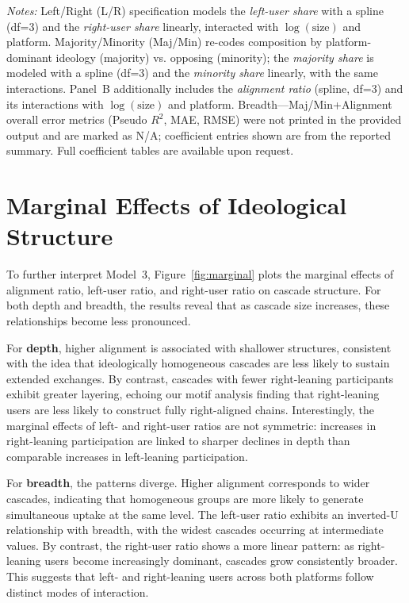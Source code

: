 \documentclass[letterpaper]{article} %
\begin{document}
\begin{table}[t]
\vspace{0.75ex}
\footnotesize
\textit{Notes:}
Left/Right (L/R) specification models the \emph{left-user share} with a spline (df=3) and the \emph{right-user share} linearly, interacted with $\log(\text{size})$ and platform.
Majority/Minority (Maj/Min) re-codes composition by platform-dominant ideology (majority) vs. opposing (minority); the \emph{majority share} is modeled with a spline (df=3) and the \emph{minority share} linearly, with the same interactions.
Panel~B additionally includes the \emph{alignment ratio} (spline, df=3) and its interactions with $\log(\text{size})$ and platform.
Breadth---Maj/Min+Alignment overall error metrics (Pseudo $R^2$, MAE, RMSE) were not printed in the provided output and are marked as N/A; coefficient entries shown are from the reported summary.
Full coefficient tables are available upon request.
\end{table}

\section*{Marginal Effects of Ideological Structure}

To further interpret Model~3, Figure~\ref{fig:marginal} plots the marginal effects of alignment ratio, left-user ratio, and right-user ratio on cascade structure. For both depth and breadth, the results reveal that as cascade size increases, these relationships become less pronounced.  

For \textbf{depth}, higher alignment is associated with shallower structures, consistent with the idea that ideologically homogeneous cascades are less likely to sustain extended exchanges. By contrast, cascades with fewer right-leaning participants exhibit greater layering, echoing our motif analysis finding that right-leaning users are less likely to construct fully right-aligned chains. Interestingly, the marginal effects of left- and right-user ratios are not symmetric: increases in right-leaning participation are linked to sharper declines in depth than comparable increases in left-leaning participation.  

For \textbf{breadth}, the patterns diverge. Higher alignment corresponds to wider cascades, indicating that homogeneous groups are more likely to generate simultaneous uptake at the same level. The left-user ratio exhibits an inverted-U relationship with breadth, with the widest cascades occurring at intermediate values. By contrast, the right-user ratio shows a more linear pattern: as right-leaning users become increasingly dominant, cascades grow consistently broader. This suggests that left- and right-leaning users across both platforms follow distinct modes of interaction.  
\end{document}

